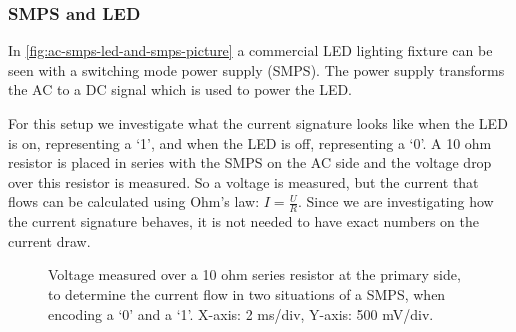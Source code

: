 

\subsubsection{SMPS and LED}

In \autoref{fig:ac-smps-led-and-smps-picture} a commercial LED lighting fixture can be seen with a switching mode power supply (SMPS).
The power supply transforms the AC to a DC signal which is used to power the LED.




For this setup we investigate what the current signature looks like when the LED is on, representing a `1', and when the LED is off,  representing a `0'.
A 10 ohm resistor is placed in series with the SMPS on the AC side and the voltage drop over this resistor is measured.
So a voltage is measured, but the current that flows can be calculated using Ohm's law: $I = \frac{U}{R}$.
Since we are investigating how the current signature behaves, it is not needed to have exact numbers on the current draw.








\begin{figure}[b]
	\centering     %

	\caption{Voltage measured over a 10 ohm series resistor at the primary side, to determine the current flow in two situations of a SMPS, when encoding a `0' and a `1'. X-axis: 2 ms/div, Y-axis: 500 mV/div.}
\end{figure}







